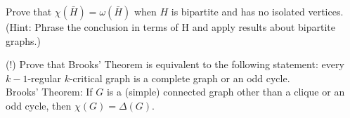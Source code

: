 \documentclass[12pt]{article}
\newenvironment{question}[2][Question]{\begin{trivlist}
\item[\hskip \labelsep {\bfseries #1}\hskip \labelsep {\bfseries #2.}]}{\end{trivlist}}
\begin{document}
\begin{question}{4}
Prove that $\chi(\bar{H}) = \omega(\bar{H})$ when $H$ is bipartite and has no isolated vertices. (Hint: Phrase the conclusion in terms of H and apply results about bipartite graphs.)
\end{question}

\begin{question}{5}
(!) Prove that Brooks' Theorem is equivalent to the following statement: every $k-1$-regular $k$-critical graph is a complete graph or an odd cycle.\\

Brooks' Theorem:
If $G$ is a (simple) connected graph other than a clique or an odd cycle, then $\chi(G) = \Delta(G)$.
\end{question}





\end{document}
